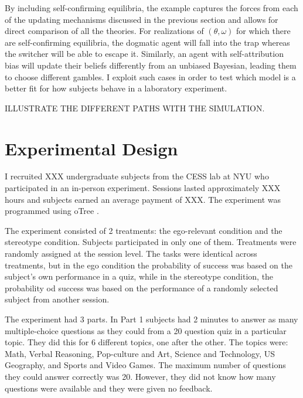 \documentclass[
  12pt,
]{article}
\begin{document}
By including self-confirming equilibria, the example captures the forces
from each of the updating mechanisms discussed in the previous section
and allows for direct comparison of all the theories. For realizations
of \((\theta, \omega)\) for which there are self-confirming equilibria,
the dogmatic agent will fall into the trap whereas the switcher will be
able to escape it. Similarly, an agent with self-attribution bias will
update their beliefs differently from an unbiased Bayesian, leading them
to choose different gambles. I exploit such cases in order to test which
model is a better fit for how subjects behave in a laboratory
experiment.

ILLUSTRATE THE DIFFERENT PATHS WITH THE SIMULATION.

\hypertarget{experimental-design}{%
\section{Experimental Design}\label{experimental-design}}

I recruited XXX undergraduate subjects from the CESS lab at NYU who
participated in an in-person experiment. Sessions lasted approximately
XXX hours and subjects earned an average payment of XXX. The experiment
was programmed using oTree \citep{chen2016otree}.

The experiment consisted of 2 treatments: the ego-relevant condition and
the stereotype condition. Subjects participated in only one of them.
Treatments were randomly assigned at the session level. The tasks were
identical across treatments, but in the ego condition the probability of
success was based on the subject's own performance in a quiz, while in
the stereotype condition, the probability od success was based on the
performance of a randomly selected subject from another session.

The experiment had 3 parts. In Part 1 subjects had 2 minutes to answer
as many multiple-choice questions as they could from a 20 question quiz
in a particular topic. They did this for 6 different topics, one after
the other. The topics were: Math, Verbal Reasoning, Pop-culture and Art,
Science and Technology, US Geography, and Sports and Video Games. The
maximum number of questions they could answer correctly was 20. However,
they did not know how many questions were available and they were given
no feedback.
\end{document}
